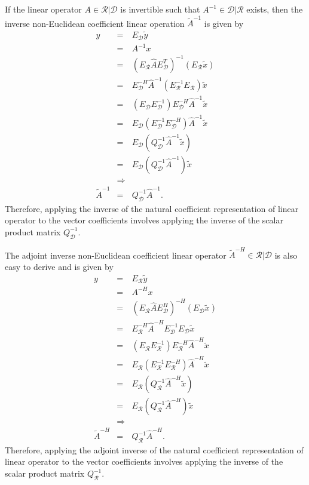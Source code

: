 If the linear operator $A\in\mathcal{R}|\mathcal{D}$ is invertible such that
$A^{-1}\in\mathcal{D}|\mathcal{R}$ exists, then the inverse non-Euclidean
coefficient linear operation $\tilde{A}^{-1}$ is given by
%
\begin{eqnarray}
y
& = & E_{\mathcal{D}} \tilde{y} \nonumber \\
& = & A^{-1} x \nonumber \\
& = & (E_{\mathcal{R}} \hat{A} E_{\mathcal{D}}^T)^{-1} (E_{\mathcal{R}} \tilde{x}) \nonumber \\
& = & E_{\mathcal{D}}^{-H} \hat{A}^{-1} (E_{\mathcal{R}}^{-1} E_{\mathcal{R}}) \tilde{x}  \nonumber \\
& = & ( E_{\mathcal{D}} E_{\mathcal{D}}^{-1} ) E_{\mathcal{D}}^{-H} \hat{A}^{-1} \tilde{x}  \nonumber \\
& = & E_{\mathcal{D}} (E_{\mathcal{D}}^{-1} E_{\mathcal{D}}^{-H}) \hat{A}^{-1} \tilde{x}  \nonumber \\
& = & E_{\mathcal{D}} ( Q_{\mathcal{D}}^{-1} \hat{A}^{-1} \tilde{x} ) \nonumber \\
& = & E_{\mathcal{D}} ( Q_{\mathcal{D}}^{-1} \hat{A}^{-1} ) \tilde{x} \nonumber \\
& \Rightarrow &  \nonumber \\
\tilde{A}^{-1} & = & Q_{\mathcal{D}}^{-1} \hat{A}^{-1}.
\label{eqn:A_natural_matrix_inverse_apply}
\end{eqnarray}
%
Therefore, applying the inverse of the natural coefficient representation of
linear operator to the vector coefficients involves applying the inverse of
the scalar product matrix $Q_{\mathcal{D}}^{-1}$.

The adjoint inverse non-Euclidean coefficient linear operator
$\tilde{A}^{-H}\in\mathcal{R}|\mathcal{D}$ is also easy to derive and is given
by
%
\begin{eqnarray}
y
& = & E_{\mathcal{R}} \tilde{y} \nonumber \\
& = & A^{-H} x \nonumber \\
& = & (E_{\mathcal{R}} \hat{A} E_{\mathcal{D}}^H)^{-H} (E_{\mathcal{D}} \tilde{x}) \nonumber \\
& = & E_{\mathcal{R}}^{-H} \hat{A}^{-H} E_{\mathcal{D}}^{-1} E_{\mathcal{D}} \tilde{x}  \nonumber \\
& = & ( E_{\mathcal{R}} E_{\mathcal{R}}^{-1} ) E_{\mathcal{R}}^{-H} \hat{A}^{-H} \tilde{x}  \nonumber \\
& = & E_{\mathcal{R}} (E_{\mathcal{R}}^{-1} E_{\mathcal{R}}^{-H}) \hat{A}^{-H} \tilde{x}  \nonumber \\
& = & E_{\mathcal{R}} ( Q_{\mathcal{R}}^{-1} \hat{A}^{-H} \tilde{x} ) \nonumber \\
& = & E_{\mathcal{R}} ( Q_{\mathcal{R}}^{-1} \hat{A}^{-H} ) \tilde{x} \nonumber \\
& \Rightarrow &  \nonumber \\
\tilde{A}^{-H} & = & Q_{\mathcal{R}}^{-1} \hat{A}^{-H}.
\label{eqn:A_natural_matrix_adjoint_inverse_apply}
\end{eqnarray}
%
Therefore, applying the adjoint inverse of the natural coefficient
representation of linear operator to the vector coefficients involves applying
the inverse of the scalar product matrix $Q_{\mathcal{R}}^{-1}$.

